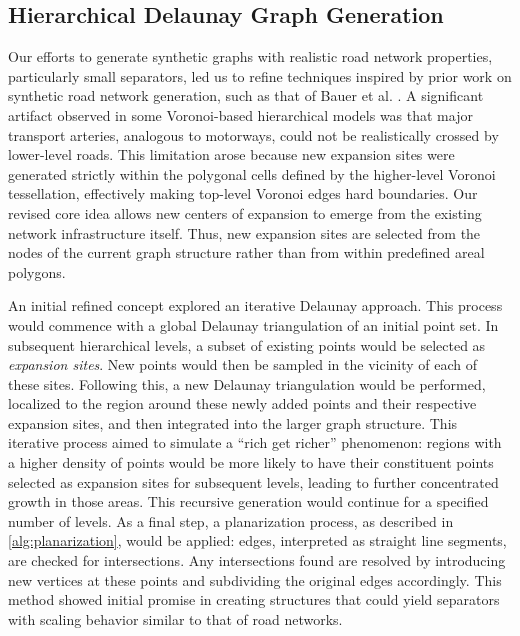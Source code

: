 \subsection{Hierarchical Delaunay Graph Generation}
\label{sec:hierarchical_delaunay_generation}

Our efforts to generate synthetic graphs with realistic road network properties, particularly small separators, led us to refine techniques inspired by prior work on synthetic road network generation, such as that of Bauer et al. \cite{hutchison_synthetic_2010}.
A significant artifact observed in some Voronoi-based hierarchical models was that major transport arteries, analogous to motorways, could not be realistically crossed by lower-level roads.
This limitation arose because new expansion sites were generated strictly within the polygonal cells defined by the higher-level Voronoi tessellation, effectively making top-level Voronoi edges hard boundaries.
Our revised core idea allows new centers of expansion to emerge from the existing network infrastructure itself. Thus, new expansion sites are selected from the nodes of the current graph structure rather than from within predefined areal polygons.

An initial refined concept explored an iterative Delaunay approach.
This process would commence with a global Delaunay triangulation of an initial point set.
In subsequent hierarchical levels, a subset of existing points would be selected as \emph{expansion sites}.
New points would then be sampled in the vicinity of each of these sites.
Following this, a new Delaunay triangulation would be performed, localized to the region around these newly added points and their respective expansion sites, and then integrated into the larger graph structure.
This iterative process aimed to simulate a \enquote{rich get richer} phenomenon: regions with a higher density of points would be more likely to have their constituent points selected as expansion sites for subsequent levels, leading to further concentrated growth in those areas.
This recursive generation would continue for a specified number of levels.
As a final step, a planarization process, as described in \cref{alg:planarization}, would be applied: edges, interpreted as straight line segments, are checked for intersections. Any intersections found are resolved by introducing new vertices at these points and subdividing the original edges accordingly.
This method showed initial promise in creating structures that could yield separators with scaling behavior similar to that of road networks.

